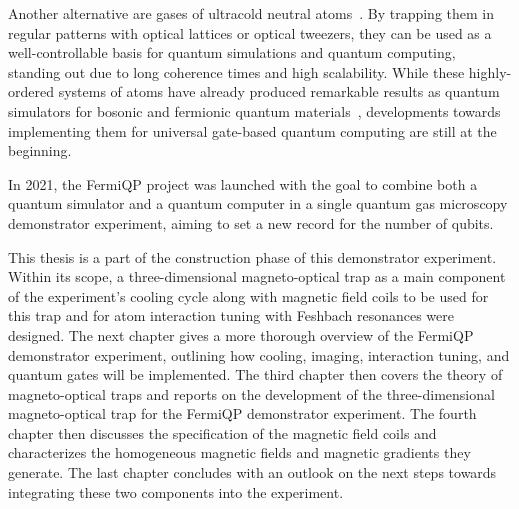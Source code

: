 Another alternative are gases of ultracold neutral atoms~\cite{deutsch_quantum_2000}. By trapping them in regular patterns with optical lattices or optical tweezers, they can be used as a well-controllable basis for quantum simulations and quantum computing, standing out due to long coherence times and high scalability. While these highly-ordered systems of atoms have already produced remarkable results as quantum simulators for bosonic and fermionic quantum materials~\cite{bloch_quantum_2012, gross_quantum_2017}, developments towards implementing them for universal gate-based quantum computing are still at the beginning.

In 2021, the FermiQP project was launched with the goal to combine both a quantum simulator and a quantum computer in a single quantum gas microscopy demonstrator experiment, aiming to set a new record for the number of qubits.

This thesis is a part of the construction phase of this demonstrator experiment. Within its scope, a three-dimensional magneto-optical trap as a main component of the experiment's cooling cycle along with magnetic field coils to be used for this trap and for atom interaction tuning with Feshbach resonances were designed. The next chapter gives a more thorough overview of the FermiQP demonstrator experiment, outlining how cooling, imaging, interaction tuning, and quantum gates will be implemented. The third chapter then covers the theory of magneto-optical traps and reports on the development of the three-dimensional magneto-optical trap for the FermiQP demonstrator experiment. The fourth chapter then discusses the specification of the magnetic field coils and characterizes the homogeneous magnetic fields and magnetic gradients they generate. The last chapter concludes with an outlook on the next steps towards integrating these two components into the experiment.


